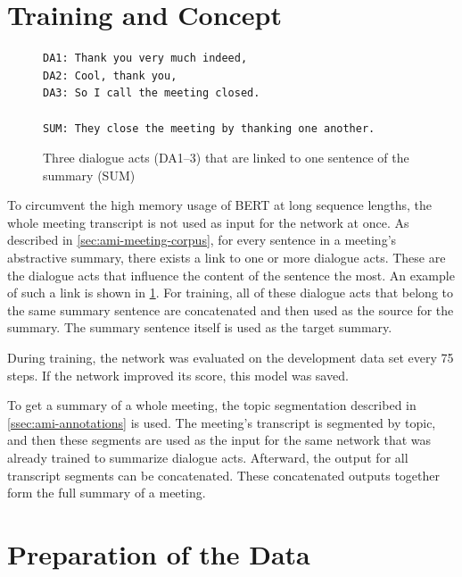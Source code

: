 
\section{Training and Concept}\label{sec:system-description-training}

\begin{figure}[h]
\begin{lstlisting}[numbers=none]
DA1: Thank you very much indeed,
DA2: Cool, thank you,
DA3: So I call the meeting closed.

SUM: They close the meeting by thanking one another.
\end{lstlisting}
\caption[Three dialogue acts that are linked to one sentence of the summary]{Three dialogue acts (DA1--3) that are linked to one sentence of the summary (SUM)}
\label{fig:dialogue-arc-summary-link-example}
\end{figure}

To circumvent the high memory usage of BERT at long sequence lengths, the whole meeting transcript is not used as input for the network at once.
As described in \cref{sec:ami-meeting-corpus}, for every sentence in a meeting's abstractive summary, there exists a link to one or more dialogue acts.
These are the dialogue acts that influence the content of the sentence the most.
An example of such a link is shown in \cref{fig:dialogue-arc-summary-link-example}.
For training, all of these dialogue acts that belong to the same summary sentence are concatenated and then used as the source for the summary.
The summary sentence itself is used as the target summary.

During training, the network was evaluated on the development data set every 75 steps.
If the network improved its score, this model was saved.

To get a summary of a whole meeting, the topic segmentation described in \cref{ssec:ami-annotations} is used.
The meeting's transcript is segmented by topic, and then these segments are used as the input for the same network that was already trained to summarize dialogue acts.
Afterward, the output for all transcript segments can be concatenated.
These concatenated outputs together form the full summary of a meeting. 

\section{Preparation of the Data}\label{sec:preparation-of-the-data}


